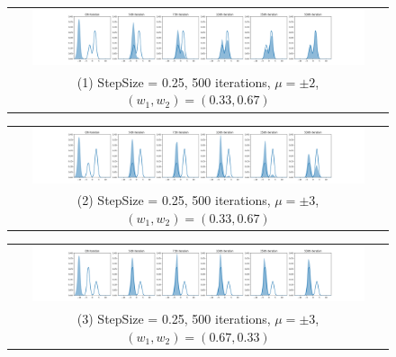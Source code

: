 
\newcommand{\toyfigwidth}{0.9\textwidth}
\begin{figure}[!htbp]
    \centering
    
    \begin{tabular}{@{}c@{}}
        \includegraphics[width=\toyfigwidth]{figs/toy-figure1.png} \\
        \small (1) StepSize = 0.25, 500 iterations, $\mu = \pm 2$, $(w_1, w_2) = (0.33, 0.67)$
    \end{tabular}
    
    \begin{tabular}{@{}c@{}}
        \includegraphics[width=\toyfigwidth]{figs/toy-figure1_step0.25_mu3.0_w0.33_gaussian.png} \\
        \small (2) StepSize = 0.25, 500 iterations, $\mu = \pm 3$, $(w_1, w_2) = (0.33, 0.67)$
    \end{tabular}
    
    \begin{tabular}{@{}c@{}}
        \includegraphics[width=\toyfigwidth]{figs/toy-figure1_step0.25_mu3.0_w0.67_gaussian.png} \\
        \small (3) StepSize = 0.25, 500 iterations, $\mu = \pm 3$, $(w_1, w_2) = (0.67, 0.33)$
    \end{tabular}
    
    

\end{figure}

